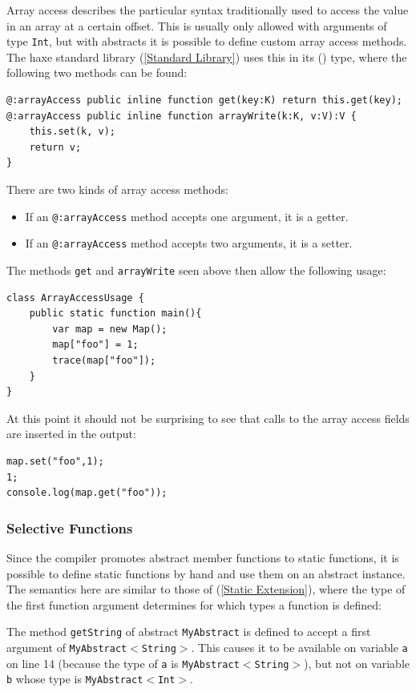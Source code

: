 \documentclass{article}
\newcommand{\type}[1]{\texttt{#1}}
\newcommand{\expr}[1]{\texttt{#1}}
\newcommand{\Fullref}[1]{\nameref{#1} (\Cref{#1})}
\newcommand{\fullref}[1]{\nameref{#1} (\cref{#1})}
\begin{document}
Array access describes the particular syntax traditionally used to access the value in an array at a certain offset. This is usually only allowed with arguments of type \type{Int}, but with abstracts it is possible to define custom array access methods. The haxe standard library (\cref{Standard Library}) uses this in its \Fullref{Map} type, where the following two methods can be found:

\begin{lstlisting}
@:arrayAccess public inline function get(key:K) return this.get(key);
@:arrayAccess public inline function arrayWrite(k:K, v:V):V {
	this.set(k, v);
	return v;
}
\end{lstlisting}
There are two kinds of array access methods:

\begin{itemize}
	\item If an \expr{@:arrayAccess} method accepts one argument, it is a getter.
	\item If an \expr{@:arrayAccess} method accepts two arguments, it is a setter.
\end{itemize}
The methods \expr{get} and \expr{arrayWrite} seen above then allow the following usage:

\begin{lstlisting}
class ArrayAccessUsage {
	public static function main(){
		var map = new Map();
		map["foo"] = 1;
		trace(map["foo"]);
	}
}
\end{lstlisting}
At this point it should not be surprising to see that calls to the array access fields are inserted in the output:

\begin{lstlisting}
map.set("foo",1);
1;
console.log(map.get("foo"));
\end{lstlisting}


\subsubsection{Selective Functions}
\label{Selective Functions}

Since the compiler promotes abstract member functions to static functions, it is possible to define static functions by hand and use them on an abstract instance. The semantics here are similar to those of \fullref{Static Extension}, where the type of the first function argument determines for which types a function is defined:


The method \expr{getString} of abstract \type{MyAbstract} is defined to accept a first argument of \type{MyAbstract$<$String$>$}. This causes it to be available on variable \expr{a} on line 14 (because the type of \expr{a} is \type{MyAbstract$<$String$>$}), but not on variable \expr{b} whose type is \type{MyAbstract$<$Int$>$}.
\end{document}
